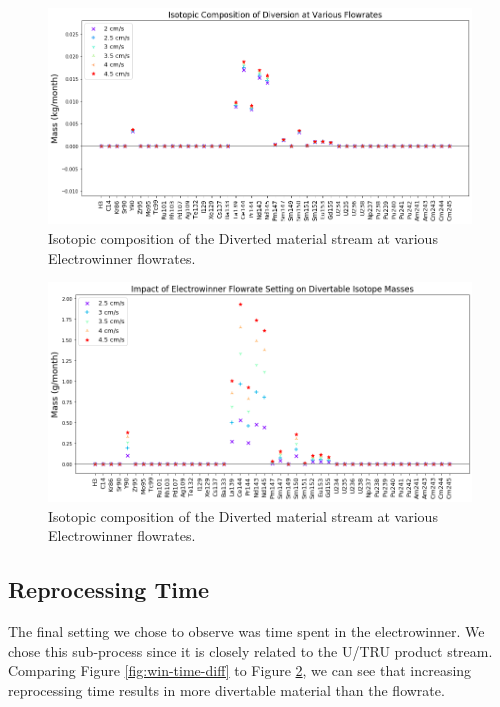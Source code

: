 \begin{figure}
	\includegraphics[width=\linewidth]{images/flowrate-sa-comp}
	\caption{Isotopic composition of the Diverted material stream at various Electrowinner flowrates.}
	\label{fig:win-flow-sa}
\end{figure}

\begin{figure}
	\includegraphics[width=\linewidth]{images/flowrate-sa-diff}
	\caption{Isotopic composition of the Diverted material stream at various Electrowinner flowrates.}
	\label{fig:win-flow-diff}
\end{figure}

\subsection{Reprocessing Time}

The final setting we chose to observe was time spent in the electrowinner. We chose this sub-process since it is closely related to the U/TRU product stream. Comparing Figure \ref{fig:win-time-diff} to Figure \ref{fig:win-flow-diff}, we can see that increasing 
reprocessing time results in more divertable material than the flowrate. 

